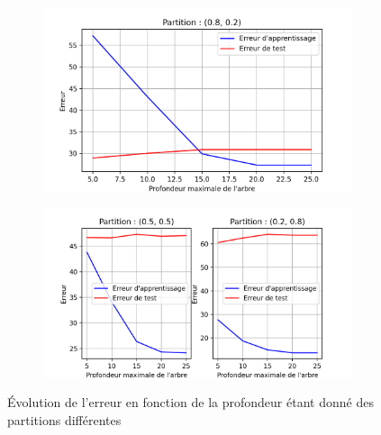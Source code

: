 \documentclass[a4paper,11pt]{article}
\theoremstyle{plain}
\theoremstyle{definition}
\begin{document}
\begin{figure}[ht]
    \begin{subfigure}{.5\textwidth}
    	\centering
    	\includegraphics{Figures/Figure_1.png}
    \end{subfigure}
    
    \begin{subfigure}{.5\textwidth}
    	\centering
    	\includegraphics{Figures/Figure_2.png}
    \end{subfigure}
\caption{Évolution de l'erreur en fonction de la profondeur étant donné des partitions différentes}
\label{TreeErrorEvolution}
\end{figure}
\end{document}
